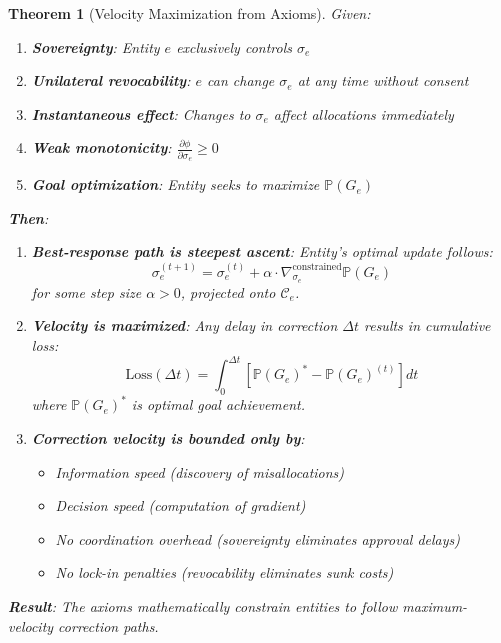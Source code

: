 \documentclass[11pt,a4paper]{article}
\newtheorem{theorem}{Theorem}[section]
\theoremstyle{definition}
\theoremstyle{remark}
\newcommand{\C}{\mathcal{C}}
\begin{document}
\begin{theorem}[Velocity Maximization from Axioms]
\label{thm:velocity-maximization}
Given:
\begin{enumerate}
\item \textbf{Sovereignty}: Entity $e$ exclusively controls $\sigma_e$
\item \textbf{Unilateral revocability}: $e$ can change $\sigma_e$ at any time without consent
\item \textbf{Instantaneous effect}: Changes to $\sigma_e$ affect allocations immediately
\item \textbf{Weak monotonicity}: $\frac{\partial \phi}{\partial \sigma_e} \ge 0$
\item \textbf{Goal optimization}: Entity seeks to maximize $\mathbb{P}(G_e)$
\end{enumerate}

\textbf{Then}:
\begin{enumerate}
\item \textbf{Best-response path is steepest ascent}: Entity's optimal update follows:
\[ \sigma_e^{(t+1)} = \sigma_e^{(t)} + \alpha \cdot \nabla_{\sigma_e}^{\text{constrained}} \mathbb{P}(G_e) \]
for some step size $\alpha > 0$, projected onto $\C_e$.

\item \textbf{Velocity is maximized}: Any delay in correction $\Delta t$ results in cumulative loss:
\[ \text{Loss}(\Delta t) = \int_0^{\Delta t} \left[ \mathbb{P}(G_e)^* - \mathbb{P}(G_e)^{(t)} \right] dt \]
where $\mathbb{P}(G_e)^*$ is optimal goal achievement.

\item \textbf{Correction velocity is bounded only by}:
\begin{itemize}
\item Information speed (discovery of misallocations)
\item Decision speed (computation of gradient)
\item No coordination overhead (sovereignty eliminates approval delays)
\item No lock-in penalties (revocability eliminates sunk costs)
\end{itemize}
\end{enumerate}

\textbf{Result}: The axioms mathematically constrain entities to follow maximum-velocity correction paths.
\end{theorem}
\end{document}

